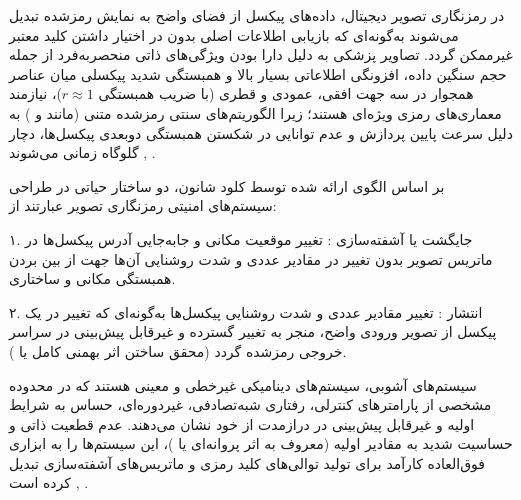 


در رمزنگاری تصویر دیجیتال، داده‌های پیکسل از فضای واضح به نمایش رمزشده تبدیل می‌شوند به‌گونه‌ای که بازیابی اطلاعات اصلی بدون در اختیار داشتن کلید معتبر غیرممکن گردد. تصاویر پزشکی به دلیل دارا بودن ویژگی‌های ذاتی منحصربه‌فرد از جمله حجم سنگین داده، افزونگی اطلاعاتی بسیار بالا و همبستگی شدید پیکسلی میان عناصر همجوار در سه جهت افقی، عمودی و قطری (با ضریب همبستگی $r \approx 1$)، نیازمند معماری‌های رمزی ویژه‌ای هستند؛ زیرا الگوریتم‌های سنتی رمزشده متنی (مانند  و ) به دلیل سرعت پایین پردازش و عدم توانایی در شکستن همبستگی دو‌بعدی پیکسل‌ها، دچار گلوگاه زمانی می‌شوند , .\par



بر اساس الگوی ارائه شده توسط کلود شانون، دو ساختار حیاتی در طراحی سیستم‌های امنیتی رمزنگاری تصویر عبارتند از:\par

۱. جایگشت یا آشفته‌سازی : تغییر موقعیت مکانی و جابه‌جایی آدرس پیکسل‌ها در ماتریس تصویر بدون تغییر در مقادیر عددی و شدت روشنایی آن‌ها جهت از بین بردن همبستگی مکانی و ساختاری.\par

۲. انتشار : تغییر مقادیر عددی و شدت روشنایی پیکسل‌ها به‌گونه‌ای که تغییر در یک پیکسل از تصویر ورودی واضح، منجر به تغییر گسترده و غیرقابل پیش‌بینی در سراسر خروجی رمزشده گردد (محقق ساختن اثر بهمنی کامل یا ).\par




سیستم‌های آشوبی، سیستم‌های دینامیکی غیرخطی و معینی هستند که در محدوده مشخصی از پارامترهای کنترلی، رفتاری شبه‌تصادفی، غیردوره‌ای، حساس به شرایط اولیه و غیرقابل پیش‌بینی در درازمدت از خود نشان می‌دهند. عدم قطعیت ذاتی و حساسیت شدید به مقادیر اولیه (معروف به اثر پروانه‌ای یا )، این سیستم‌ها را به ابزاری فوق‌العاده کارآمد برای تولید توالی‌های کلید رمزی و ماتریس‌های آشفته‌سازی تبدیل کرده است , .\par

